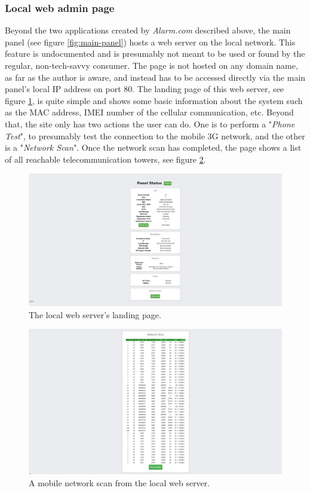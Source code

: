 \subsubsection{Local web admin page}
Beyond the two applications created by \textit{Alarm.com} described above, the main panel (see figure \ref{fig:main-panel}) hosts a web server on the local network. This feature is undocumented and is presumably not meant to be used or found by the regular, non-tech-savvy consumer. The page is not hosted on any domain name, as far as the author is aware, and instead has to be accessed directly via the main panel's local IP address on port 80. The landing page of this web server, see figure \ref{fig:local-landing-page}, is quite simple and shows some basic information about the system such as the MAC address, IMEI number of the cellular communication, etc. Beyond that, the site only has two actions the user can do. One is to perform a "\textit{Phone Test}", to presumably test the connection to the mobile 3G network, and the other is a "\textit{Network Scan}". Once the network scan has completed, the page shows a list of all reachable telecommunication towers, see figure \ref{fig:local-network-scan}.
\begin{figure}[!ht]
    \centering
    \includegraphics[width=\textwidth]{images/3-system/local-landing-page.png}
    \caption{The local web server's landing page.}
    \label{fig:local-landing-page}
\end{figure}
\begin{figure}[!ht]
    \centering
    \includegraphics[width=\textwidth]{images/3-system/local-network-scan.png}
    \caption{A mobile network scan from the local web server.}
    \label{fig:local-network-scan}
\end{figure}
